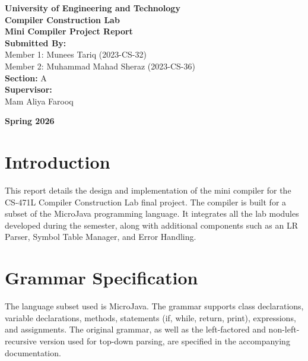 \documentclass[12pt,a4paper]{article}
\begin{document}
\begin{titlepage}
    \centering
    \vspace*{1.5cm}
    
    {\Huge \textbf{University of Engineering and Technology}}\\[2cm]
    
    {\LARGE \textbf{Compiler Construction Lab}}\\[0.5cm]
    {\Large \textbf{Mini Compiler Project Report}}\\[2.5cm]
    
    {\Large \textbf{Submitted By:}}\\[0.5cm]
    {\large Member 1: Munees Tariq (2023-CS-32)}\\[0.2cm]
    {\large Member 2: Muhammad Mahad Sheraz (2023-CS-36)}\\[1.5cm]
    
    {\large \textbf{Section:}} A\\[2cm]
    
    {\Large \textbf{Supervisor:}}\\[0.5cm]
    {\large Mam Aliya Farooq}\\[2cm]
    
    \vfill
    
    {\large \textbf{Spring 2026}}
\end{titlepage}

\tableofcontents
\newpage

\section{Introduction}
This report details the design and implementation of the mini compiler for the CS-471L Compiler Construction Lab final project. The compiler is built for a subset of the MicroJava programming language. It integrates all the lab modules developed during the semester, along with additional components such as an LR Parser, Symbol Table Manager, and Error Handling.

\section{Grammar Specification}
The language subset used is MicroJava. The grammar supports class declarations, variable declarations, methods, statements (if, while, return, print), expressions, and assignments. 
The original grammar, as well as the left-factored and non-left-recursive version used for top-down parsing, are specified in the accompanying documentation.
\end{document}
